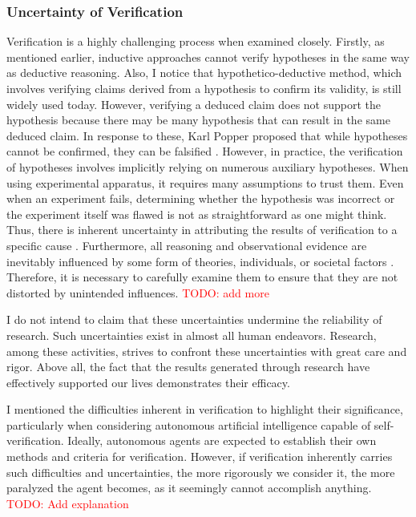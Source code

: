 \documentclass{book}
\begin{document}
\subsubsection{Uncertainty of Verification}
Verification is a highly challenging process when examined closely. Firstly, as mentioned earlier, inductive approaches cannot verify hypotheses in the same way as deductive reasoning. Also, I notice that hypothetico-deductive method, which involves verifying claims derived from a hypothesis to confirm its validity, is still widely used today. However, verifying a deduced claim does not support the hypothesis because there may be many hypothesis that can result in the same deduced claim. In response to these, Karl Popper proposed that while hypotheses cannot be confirmed, they can be falsified \cite{sep-scientific-method}. However, in practice, the verification of hypotheses involves implicitly relying on numerous auxiliary hypotheses. When using experimental apparatus, it requires many assumptions to trust them. Even when an experiment fails, determining whether the hypothesis was incorrect or the experiment itself was flawed is not as straightforward as one might think. Thus, there is inherent uncertainty in attributing the results of verification to a specific cause \cite{chalmers2013thing,sep-physics-experiment,sep-scientific-underdetermination}. Furthermore, all reasoning and observational evidence are inevitably influenced by some form of theories, individuals, or societal factors \cite{sep-science-theory-observation}. Therefore, it is necessary to carefully examine them to ensure that they are not distorted by unintended influences. \textcolor{red}{TODO: add more}

I do not intend to claim that these uncertainties undermine the reliability of research. Such uncertainties exist in almost all human endeavors. Research, among these activities, strives to confront these uncertainties with great care and rigor. Above all, the fact that the results generated through research have effectively supported our lives demonstrates their efficacy.

I mentioned the difficulties inherent in verification to highlight their significance, particularly when considering autonomous artificial intelligence capable of self-verification. Ideally, autonomous agents are expected to establish their own methods and criteria for verification. However, if verification inherently carries such difficulties and uncertainties, the more rigorously we consider it, the more paralyzed the agent becomes, as it seemingly cannot accomplish anything. \textcolor{red}{TODO: Add explanation}
\end{document}
